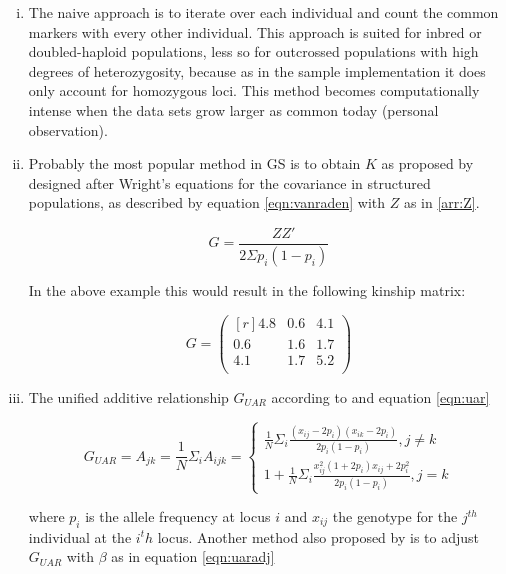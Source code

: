 \begin{enumerate}[(i)]
\item The naive approach is to iterate over each individual and count the common markers
  with every other individual. This approach is suited for inbred or doubled-haploid
  populations, less so for outcrossed populations with high degrees of heterozygosity,
  because as in the sample implementation it does only account for homozygous loci. This
  method becomes computationally intense when the data sets grow larger as common today
  (personal observation).
\item Probably the most popular method in GS is to obtain $K$ as proposed by
  \cite{vanraden2008efficient} designed after Wright's \cite{wright1922coefficients}
  equations for the covariance in structured populations, as described by equation
  \ref{eqn:vanraden} with $Z$ as in \ref{arr:Z}.

\begin{equation}
 G = \frac{ZZ'}{2 \Sigma p_i (1-p_i)} 
\label{eqn:vanraden}
\end{equation}

In the above example this would result in the following kinship matrix:

\begin{equation}
 G = 
 \begin{pmatrix}[r]
  4.8 & 0.6 & 4.1  \\
  0.6 & 1.6 & 1.7  \\
  4.1 & 1.7 & 5.2  \\
 \end{pmatrix}
 \label{arr:Z}
\end{equation}


\item The unified additive relationship $G_{UAR}$ according to \cite{yang2010common} and equation \ref{eqn:uar}

\begin{equation}
 G_{UAR} = A_{jk} = \frac{1}{N} \Sigma_i{A_{ijk}} = \left\{
  \!\begin{aligned}
   \frac{1}{N} \Sigma_{i} \frac{(x_{ij} - 2p_i)(x_{ik} - 2p_i)}{2p_i (1-p_i)}, j \ne k \\
   1 + \frac{1}{N} \Sigma_i \frac{x_{ij}^2 (1+2p_i) x_{ij} + 2p_i^2 }{2p_i (1-p_i)}, j = k   
  \end{aligned}
 \right.
 \label{eqn:uar}
\end{equation}

where $p_i$ is the allele frequency at locus $i$ and $x_{ij}$ the genotype for the
$j^{th}$ individual at the $i^th$ locus. Another method also proposed by
\cite{yang2010common} is to adjust $G_{UAR}$ with $\beta$ as in equation \ref{eqn:uaradj}


\end{enumerate}
